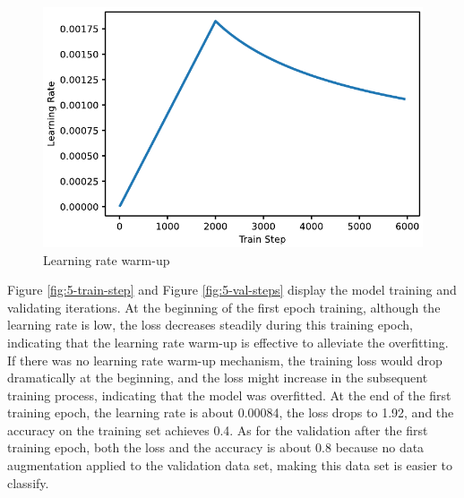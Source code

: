 \begin{figure}
    \vspace*{-1.2em}
    \centering
    \includegraphics[width=.6\textwidth]{evaluation/imgs/5-lr-warmup.pdf}
    \caption{Learning rate warm-up}
    \label{fig:5-lr-warmup}
\end{figure}

Figure \ref{fig:5-train-step} and Figure \ref{fig:5-val-steps} display the model training and validating iterations.
At the beginning of the first epoch training, although the learning rate is low, the loss decreases steadily during this training epoch, indicating that the learning rate warm-up is effective to alleviate the overfitting.
If there was no learning rate warm-up mechanism, the training loss would drop dramatically at the beginning, and the loss might increase in the subsequent training process, indicating that the model was overfitted.
At the end of the first training epoch, the learning rate is about 0.00084, the loss drops to 1.92, and the accuracy on the training set achieves 0.4.
As for the validation after the first training epoch, both the loss and the accuracy is about 0.8 because no data augmentation applied to the validation data set, making this data set is easier to classify.

